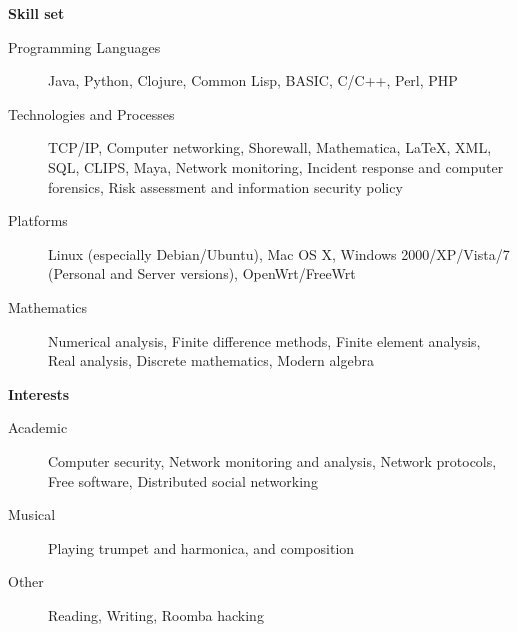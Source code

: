 \documentclass[letterpaper,11pt]{article}
\newcommand{\resheading}[1]{{\large \colorbox{mygrey}{\begin{minipage}{\textwidth}{\textbf{#1 \vphantom{p\^{E}}}}\end{minipage}}}}
\begin{document}
\resheading{Skill set}
\begin{description}
\item[Programming Languages]
Java, Python, Clojure, Common Lisp, BASIC, C/C++, Perl, PHP
\item[Technologies and Processes]
TCP/IP, Computer networking, Shorewall, Mathematica, \LaTeX, XML, SQL, CLIPS, Maya, Network monitoring, Incident response and computer forensics, Risk assessment and information security policy
\item[Platforms]
Linux (especially Debian/Ubuntu), Mac OS X, Windows 2000/XP/Vista/7 (Personal and Server versions), OpenWrt/FreeWrt
\item[Mathematics]
Numerical analysis, Finite difference methods, Finite element analysis, Real analysis, Discrete mathematics, Modern algebra
\end{description}

\resheading{Interests}

\begin{description}
\item[Academic] Computer security, Network monitoring and analysis, Network protocols, Free software, Distributed social networking
\item[Musical] Playing trumpet and harmonica, and composition
\item[Other] Reading, Writing, Roomba hacking
\end{description}
\end{document}
